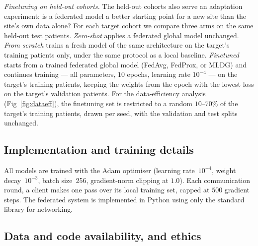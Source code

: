 \documentclass[10pt,letterpaper]{article}
\begin{document}
\emph{Finetuning on held-out cohorts.} The held-out cohorts also serve an
adaptation experiment: is a federated model a better starting point for a new
site than the site's own data alone? For each target cohort we compare three
arms on the same held-out test patients. \emph{Zero-shot} applies a federated
global model unchanged. \emph{From scratch} trains a fresh model of the same
architecture on the target's training patients only, under the same protocol
as a local baseline. \emph{Finetuned} starts from a trained federated global
model (FedAvg, FedProx, or MLDG) and continues training --- all parameters,
$10$ epochs, learning rate $10^{-4}$ --- on the target's training patients,
keeping the weights from the epoch with the lowest loss on the target's
validation patients. For the data-efficiency analysis (Fig~\ref{fig:dataeff}),
the finetuning set is restricted to a random $10$--$70\%$ of the target's
training patients, drawn per seed, with the validation and test splits
unchanged.

\subsection*{Implementation and training details}

All models are trained with the Adam optimiser (learning rate~$10^{-4}$, weight
decay~$10^{-3}$, batch size~256, gradient-norm clipping at $1.0$). Each
communication round, a client makes one pass over its local training set,
capped at $500$ gradient steps. The
federated system is implemented in Python using only the standard library for
networking.

\subsection*{Data and code availability, and ethics}
\end{document}
